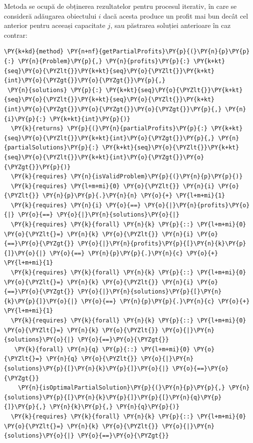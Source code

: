 \begin{sloppypar}
    Metoda  se ocupă de obținerea rezultatelor pentru procesul iterativ, în care se consideră adăugarea obiectului $i$ dacă acesta produce un profit mai bun decât cel anterior pentru aceeași capacitate $j$, sau păstrarea soluției anterioare în caz contrar:
    \begin{Verbatim}[commandchars=\\\{\}]
\PY{k+kd}{method} \PY{n+nf}{getPartialProfits}\PY{p}{(}\PY{n}{p}\PY{p}{:} \PY{n}{Problem}\PY{p}{,} \PY{n}{profits}\PY{p}{:} \PY{k+kt}{seq}\PY{o}{\PYZlt{}}\PY{k+kt}{seq}\PY{o}{\PYZlt{}}\PY{k+kt}{int}\PY{o}{\PYZgt{}}\PY{o}{\PYZgt{}}\PY{p}{,} 
 \PY{n}{solutions} \PY{p}{:} \PY{k+kt}{seq}\PY{o}{\PYZlt{}}\PY{k+kt}{seq}\PY{o}{\PYZlt{}}\PY{k+kt}{seq}\PY{o}{\PYZlt{}}\PY{k+kt}{int}\PY{o}{\PYZgt{}}\PY{o}{\PYZgt{}}\PY{o}{\PYZgt{}}\PY{p}{,} \PY{n}{i}\PY{p}{:} \PY{k+kt}{int}\PY{p}{)} 
  \PY{k}{returns} \PY{p}{(}\PY{n}{partialProfits}\PY{p}{:} \PY{k+kt}{seq}\PY{o}{\PYZlt{}}\PY{k+kt}{int}\PY{o}{\PYZgt{}}\PY{p}{,} \PY{n}{partialSolutions}\PY{p}{:} \PY{k+kt}{seq}\PY{o}{\PYZlt{}}\PY{k+kt}{seq}\PY{o}{\PYZlt{}}\PY{k+kt}{int}\PY{o}{\PYZgt{}}\PY{o}{\PYZgt{}}\PY{p}{)}
  \PY{k}{requires} \PY{n}{isValidProblem}\PY{p}{(}\PY{n}{p}\PY{p}{)}
  \PY{k}{requires} \PY{l+m+mi}{0} \PY{o}{\PYZlt{}} \PY{n}{i} \PY{o}{\PYZlt{}} \PY{n}{p}\PY{p}{.}\PY{n}{n} \PY{o}{+} \PY{l+m+mi}{1}
  \PY{k}{requires} \PY{n}{i} \PY{o}{==} \PY{o}{|}\PY{n}{profits}\PY{o}{|} \PY{o}{==} \PY{o}{|}\PY{n}{solutions}\PY{o}{|}
  \PY{k}{requires} \PY{k}{forall} \PY{n}{k} \PY{p}{::} \PY{l+m+mi}{0} \PY{o}{\PYZlt{}=} \PY{n}{k} \PY{o}{\PYZlt{}} \PY{n}{i} \PY{o}{==}\PY{o}{\PYZgt{}} \PY{o}{|}\PY{n}{profits}\PY{p}{[}\PY{n}{k}\PY{p}{]}\PY{o}{|} \PY{o}{==} \PY{n}{p}\PY{p}{.}\PY{n}{c} \PY{o}{+} \PY{l+m+mi}{1}
  \PY{k}{requires} \PY{k}{forall} \PY{n}{k} \PY{p}{::} \PY{l+m+mi}{0} \PY{o}{\PYZlt{}=} \PY{n}{k} \PY{o}{\PYZlt{}} \PY{n}{i} \PY{o}{==}\PY{o}{\PYZgt{}} \PY{o}{|}\PY{n}{solutions}\PY{p}{[}\PY{n}{k}\PY{p}{]}\PY{o}{|} \PY{o}{==} \PY{n}{p}\PY{p}{.}\PY{n}{c} \PY{o}{+} \PY{l+m+mi}{1}
  \PY{k}{requires} \PY{k}{forall} \PY{n}{k} \PY{p}{::} \PY{l+m+mi}{0} \PY{o}{\PYZlt{}=} \PY{n}{k} \PY{o}{\PYZlt{}} \PY{o}{|}\PY{n}{solutions}\PY{o}{|} \PY{o}{==}\PY{o}{\PYZgt{}} 
   \PY{k}{forall} \PY{n}{q} \PY{p}{::} \PY{l+m+mi}{0} \PY{o}{\PYZlt{}=} \PY{n}{q} \PY{o}{\PYZlt{}} \PY{o}{|}\PY{n}{solutions}\PY{p}{[}\PY{n}{k}\PY{p}{]}\PY{o}{|} \PY{o}{==}\PY{o}{\PYZgt{}} 
    \PY{n}{isOptimalPartialSolution}\PY{p}{(}\PY{n}{p}\PY{p}{,} \PY{n}{solutions}\PY{p}{[}\PY{n}{k}\PY{p}{]}\PY{p}{[}\PY{n}{q}\PY{p}{]}\PY{p}{,} \PY{n}{k}\PY{p}{,} \PY{n}{q}\PY{p}{)} 
  \PY{k}{requires} \PY{k}{forall} \PY{n}{k} \PY{p}{::} \PY{l+m+mi}{0} \PY{o}{\PYZlt{}=} \PY{n}{k} \PY{o}{\PYZlt{}} \PY{o}{|}\PY{n}{solutions}\PY{o}{|} \PY{o}{==}\PY{o}{\PYZgt{}} 

\end{Verbatim}
\end{sloppypar}
